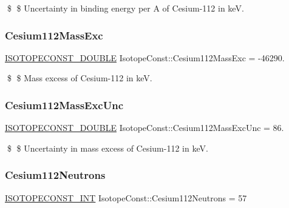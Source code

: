 \$ \$ Uncertainty in binding energy per A of Cesium-\/112 in keV. \mbox{\label{group___isotope_const-_cesium-_cs112_gac83193266b2a7c5e9fb60151b70dfad1}} 
\subsubsection{\texorpdfstring{Cesium112\+Mass\+Exc}{Cesium112MassExc}}
{\footnotesize\ttfamily \mbox{\hyperlink{group___isotope_const-_macros_ga8f45a7272ce02c0b4c65c44636ed719a}{I\+S\+O\+T\+O\+P\+E\+C\+O\+N\+S\+T\+\_\+\+D\+O\+U\+B\+LE}} Isotope\+Const\+::\+Cesium112\+Mass\+Exc = -\/46290.}

\$ \$ Mass excess of Cesium-\/112 in keV. \mbox{\label{group___isotope_const-_cesium-_cs112_ga19c51cb2c7f5e7ab574cbf259c30208f}} 
\subsubsection{\texorpdfstring{Cesium112\+Mass\+Exc\+Unc}{Cesium112MassExcUnc}}
{\footnotesize\ttfamily \mbox{\hyperlink{group___isotope_const-_macros_ga8f45a7272ce02c0b4c65c44636ed719a}{I\+S\+O\+T\+O\+P\+E\+C\+O\+N\+S\+T\+\_\+\+D\+O\+U\+B\+LE}} Isotope\+Const\+::\+Cesium112\+Mass\+Exc\+Unc = 86.}

\$ \$ Uncertainty in mass excess of Cesium-\/112 in keV. \mbox{\label{group___isotope_const-_cesium-_cs112_gad310de4b2b19d51036c8fd495f933396}} 
\subsubsection{\texorpdfstring{Cesium112\+Neutrons}{Cesium112Neutrons}}
{\footnotesize\ttfamily \mbox{\hyperlink{group___isotope_const-_macros_ga5f18360b3e99483a35c32d789e62621c}{I\+S\+O\+T\+O\+P\+E\+C\+O\+N\+S\+T\+\_\+\+I\+NT}} Isotope\+Const\+::\+Cesium112\+Neutrons = 57}

